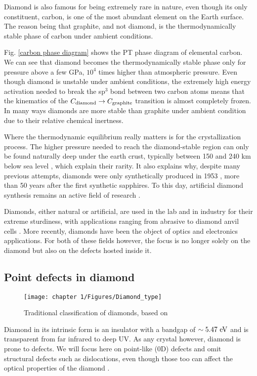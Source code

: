 \documentclass[a4paper, 11pt]{book}
\begin{document}
Diamond is also famous for being extremely rare in nature, even though its only constituent, carbon, is one of the most abundant element on the Earth surface. The reason being that graphite, and not diamond, is the thermodynamically stable phase of carbon under ambient conditions.

Fig. \ref{carbon phase diagram} shows the PT phase diagram of elemental carbon. We can see that diamond becomes the thermodynamically stable phase only for pressure above a few GPa, $10^4$ times higher than atmospheric pressure. Even though diamond is unstable under ambient conditions, the extremely high energy activation needed to break the sp$^3$ bond between two carbon atoms means that the kinematics of the $C_{\rm diamond} \to C_{\rm graphite}$ transition is almost completely frozen. In many ways diamonds are more stable than graphite under ambient condition due to their relative chemical inertness.

Where the thermodynamic equilibrium really matters is for the crystallization process. The higher pressure needed to reach the diamond-stable region can only be found naturally deep under the earth crust, typically between 150 and 240 km below sea level \citep{tappert2011diamonds}, which explain their rarity. It also explains why, despite many previous attempts, diamonds were only synthetically produced in 1953 \citep{barnard2000diamond}, more than 50 years after the first synthetic sapphires. To this day, artificial diamond synthesis remains an active field of research \citep{shenderova2019synthesis, achard2020chemical}.

Diamonds, either natural or artificial, are used in the lab and in industry for their extreme sturdiness, with applications ranging from abrasive to diamond anvil cells \citep{jayaraman1983diamond}. More recently, diamonds have been the object of optics and electronics applications. For both of these fields however, the focus is no longer solely on the diamond but also on the defects hosted inside it.

\subsection{Point defects in diamond}
\begin{figure}[h!]
\centering
\texttt{[image: chapter 1/Figures/Diamond\_type]}
\caption{Traditional classification of diamonds, based on \citep{tappert2011diamonds}}
\label{diamond type}
\end{figure}
Diamond in its intrinsic form is an insulator with a bandgap of $\sim 5.47\ \rm eV$ and is transparent from far infrared to deep UV. As any crystal however, diamond is prone to defects. We will focus here on point-like (0D) defects and omit structural defects such as dislocations, even though those too can affect the optical properties of the diamond \citep{collins2000colour}. 
\end{document}
